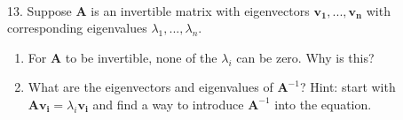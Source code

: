 \documentclass{article}
\begin{document}
~\\

13. Suppose $\mathbf{A}$ is an invertible matrix with eigenvectors $\mathbf{v_1}, ..., \mathbf{v_n}$ with corresponding eigenvalues $\lambda_1, ..., \lambda_n$.

\begin{enumerate}

	\item For $\mathbf{A}$ to be invertible, none of the $\lambda_i$ can be zero. Why is this?

	\item What are the eigenvectors and eigenvalues of $\mathbf{A}^{-1}$? Hint: start with $\mathbf{Av_i} = \lambda_i \mathbf{v_i}$ and find a way to introduce $\mathbf{A}^{-1}$ into the equation.

\end{enumerate}
\end{document}
